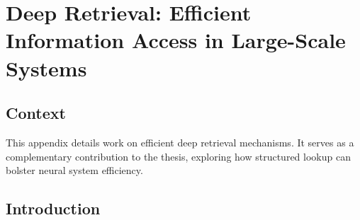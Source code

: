 \chapter{Deep Retrieval: Efficient Information Access in Large-Scale Systems}
\label{app:deep-retrieval}

\section*{Context}
This appendix details work on efficient deep retrieval mechanisms. It serves as a complementary contribution to the thesis, exploring how structured lookup can bolster neural system efficiency.

\section{Introduction}
\blindtext
